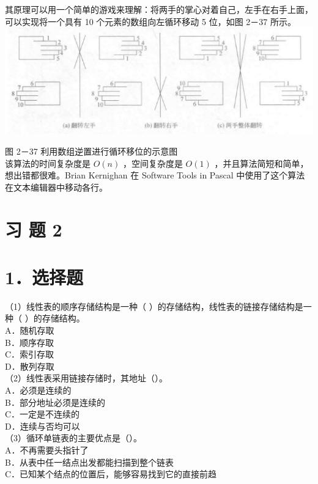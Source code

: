 \documentclass[10pt]{article}
\begin{document}
其原理可以用一个简单的游戏来理解：将两手的掌心对着自己，左手在右手上面，可以实现将一个具有 10 个元素的数组向左循环移动 5 位，如图 2－37 所示。\\
\includegraphics[max width=\textwidth, center]{2025_06_06_704745ea57b15b2333e5g-077}

图 2－37 利用数组逆置进行循环移位的示意图\\
该算法的时间复杂度是 $O(n)$ ，空间复杂度是 $O(1)$ ，并且算法简短和简单，想出错都很难。Brian Kernighan 在 Software Tools in Pascal 中使用了这个算法在文本编辑器中移动各行。

\section*{习 题 2}
\section*{1．选择题}
（1）线性表的顺序存储结构是一种（ ）的存储结构，线性表的链接存储结构是一种（ ）的存储结构。\\
A．随机存取\\
B．顺序存取\\
C．索引存取\\
D．散列存取\\
（2）线性表采用链接存储时，其地址（）。\\
A．必须是连续的\\
B．部分地址必须是连续的\\
C．一定是不连续的\\
D．连续与否均可以\\
（3）循环单链表的主要优点是（）。\\
A．不再需要头指针了\\
B．从表中任一结点出发都能扫描到整个链表\\
C．已知某个结点的位置后，能够容易找到它的直接前趋
\end{document}
